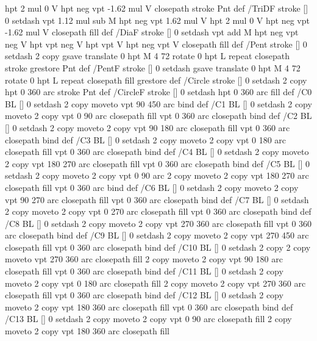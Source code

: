 {{  hpt 2 mul 0 V
  hpt neg vpt -1.62 mul V closepath stroke
  Pnt  } def
/TriDF { stroke [] 0 setdash vpt 1.12 mul sub M
  hpt neg vpt 1.62 mul V
  hpt 2 mul 0 V
  hpt neg vpt -1.62 mul V closepath fill} def
/DiaF { stroke [] 0 setdash vpt add M
  hpt neg vpt neg V hpt vpt neg V
  hpt vpt V hpt neg vpt V closepath fill } def
/Pent { stroke [] 0 setdash 2 copy gsave
  translate 0 hpt M 4 {72 rotate 0 hpt L} repeat
  closepath stroke grestore Pnt } def
/PentF { stroke [] 0 setdash gsave
  translate 0 hpt M 4 {72 rotate 0 hpt L} repeat
  closepath fill grestore } def
/Circle { stroke [] 0 setdash 2 copy
  hpt 0 360 arc stroke Pnt } def
/CircleF { stroke [] 0 setdash hpt 0 360 arc fill } def
/C0 { BL [] 0 setdash 2 copy moveto vpt 90 450  arc } bind def
/C1 { BL [] 0 setdash 2 copy        moveto
       2 copy  vpt 0 90 arc closepath fill
               vpt 0 360 arc closepath } bind def
/C2 { BL [] 0 setdash 2 copy moveto
       2 copy  vpt 90 180 arc closepath fill
               vpt 0 360 arc closepath } bind def
/C3 { BL [] 0 setdash 2 copy moveto
       2 copy  vpt 0 180 arc closepath fill
               vpt 0 360 arc closepath } bind def
/C4 { BL [] 0 setdash 2 copy moveto
       2 copy  vpt 180 270 arc closepath fill
               vpt 0 360 arc closepath } bind def
/C5 { BL [] 0 setdash 2 copy moveto
       2 copy  vpt 0 90 arc
       2 copy moveto
       2 copy  vpt 180 270 arc closepath fill
               vpt 0 360 arc } bind def
/C6 { BL [] 0 setdash 2 copy moveto
      2 copy  vpt 90 270 arc closepath fill
              vpt 0 360 arc closepath } bind def
/C7 { BL [] 0 setdash 2 copy moveto
      2 copy  vpt 0 270 arc closepath fill
              vpt 0 360 arc closepath } bind def
/C8 { BL [] 0 setdash 2 copy moveto
      2 copy vpt 270 360 arc closepath fill
              vpt 0 360 arc closepath } bind def
/C9 { BL [] 0 setdash 2 copy moveto
      2 copy  vpt 270 450 arc closepath fill
              vpt 0 360 arc closepath } bind def
/C10 { BL [] 0 setdash 2 copy 2 copy moveto vpt 270 360 arc closepath fill
       2 copy moveto
       2 copy vpt 90 180 arc closepath fill
               vpt 0 360 arc closepath } bind def
/C11 { BL [] 0 setdash 2 copy moveto
       2 copy  vpt 0 180 arc closepath fill
       2 copy moveto
       2 copy  vpt 270 360 arc closepath fill
               vpt 0 360 arc closepath } bind def
/C12 { BL [] 0 setdash 2 copy moveto
       2 copy  vpt 180 360 arc closepath fill
               vpt 0 360 arc closepath } bind def
/C13 { BL [] 0 setdash  2 copy moveto
       2 copy  vpt 0 90 arc closepath fill
       2 copy moveto
       2 copy  vpt 180 360 arc closepath fill
}}

